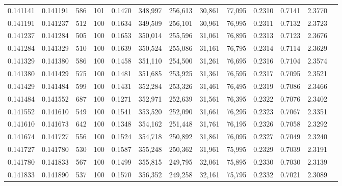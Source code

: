 \begin{tabular}{rrrrrrrrrrrrr}
0.141141 & 0.141191 &   586 & 101 &                                     0.1470 & 348,997 & 256,613 &  30,861 &  77,095 & 0.2310 & 0.7141 & 2.3770 \\
0.141191 & 0.141237 &   512 & 100 &                                     0.1634 & 349,509 & 256,101 &  30,961 &  76,995 & 0.2311 & 0.7132 & 2.3723 \\
0.141237 & 0.141284 &   505 & 100 &                                     0.1653 & 350,014 & 255,596 &  31,061 &  76,895 & 0.2313 & 0.7123 & 2.3676 \\
0.141284 & 0.141329 &   510 & 100 &                                     0.1639 & 350,524 & 255,086 &  31,161 &  76,795 & 0.2314 & 0.7114 & 2.3629 \\
0.141329 & 0.141380 &   586 & 100 &                                     0.1458 & 351,110 & 254,500 &  31,261 &  76,695 & 0.2316 & 0.7104 & 2.3574 \\
0.141380 & 0.141429 &   575 & 100 &                                     0.1481 & 351,685 & 253,925 &  31,361 &  76,595 & 0.2317 & 0.7095 & 2.3521 \\
0.141429 & 0.141484 &   599 & 100 &                                     0.1431 & 352,284 & 253,326 &  31,461 &  76,495 & 0.2319 & 0.7086 & 2.3466 \\
0.141484 & 0.141552 &   687 & 100 &                                     0.1271 & 352,971 & 252,639 &  31,561 &  76,395 & 0.2322 & 0.7076 & 2.3402 \\
0.141552 & 0.141610 &   549 & 100 &                                     0.1541 & 353,520 & 252,090 &  31,661 &  76,295 & 0.2323 & 0.7067 & 2.3351 \\
0.141610 & 0.141673 &   642 & 100 &                                     0.1348 & 354,162 & 251,448 &  31,761 &  76,195 & 0.2326 & 0.7058 & 2.3292 \\
0.141674 & 0.141727 &   556 & 100 &                                     0.1524 & 354,718 & 250,892 &  31,861 &  76,095 & 0.2327 & 0.7049 & 2.3240 \\
0.141727 & 0.141780 &   530 & 100 &                                     0.1587 & 355,248 & 250,362 &  31,961 &  75,995 & 0.2329 & 0.7039 & 2.3191 \\
0.141780 & 0.141833 &   567 & 100 &                                     0.1499 & 355,815 & 249,795 &  32,061 &  75,895 & 0.2330 & 0.7030 & 2.3139 \\
0.141833 & 0.141890 &   537 & 100 &                                     0.1570 & 356,352 & 249,258 &  32,161 &  75,795 & 0.2332 & 0.7021 & 2.3089 \\

\end{tabular}
